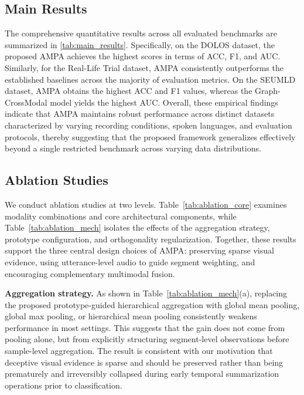 \documentclass[sigconf,screen,review,anonymous]{acmart}
\begin{document}
\subsection{Main Results}

The comprehensive quantitative results across all evaluated benchmarks are summarized in \cref{tab:main_results}. Specifically, on the DOLOS dataset, the proposed AMPA achieves the highest scores in terms of ACC, F1, and AUC. Similarly, for the Real-Life Trial dataset, AMPA consistently outperforms the established baselines across the majority of evaluation metrics. On the SEUMLD dataset, AMPA obtains the highest ACC and F1 values, whereas the Graph-CrossModal model yields the highest AUC. Overall, these empirical findings indicate that AMPA maintains robust performance across distinct datasets characterized by varying recording conditions, spoken languages, and evaluation protocols, thereby suggesting that the proposed framework generalizes effectively beyond a single restricted benchmark across varying data distributions.



\subsection{Ablation Studies}

We conduct ablation studies at two levels. Table~\ref{tab:ablation_core} examines modality combinations and core architectural components, while Table~\ref{tab:ablation_mech} isolates the effects of the aggregation strategy, prototype configuration, and orthogonality regularization. Together, these results support the three central design choices of AMPA: preserving sparse visual evidence, using utterance-level audio to guide segment weighting, and encouraging complementary multimodal fusion.

\textbf{Aggregation strategy.} As shown in Table~\ref{tab:ablation_mech}(a), replacing the proposed prototype-guided hierarchical aggregation with global mean pooling, global max pooling, or hierarchical mean pooling consistently weakens performance in most settings. This suggests that the gain does not come from pooling alone, but from explicitly structuring segment-level observations before sample-level aggregation. The result is consistent with our motivation that deceptive visual evidence is sparse and should be preserved rather than being prematurely and irreversibly collapsed during early temporal summarization operations prior to classification.
\end{document}
